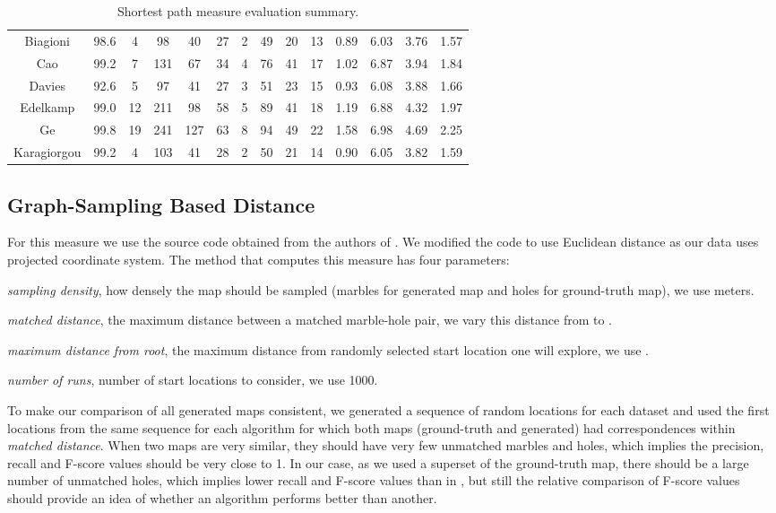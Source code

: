 \documentclass[natbib]{svjour3}                    \smartqed  \usepackage[table]{xcolor}
\begin{document}
\begin{table}[htbp]
{\begin{tabular}{|c||c|c c c c|c c c c|c c c c|}
Biagioni&98.6&4&98&40&27&2&49&20&13&0.89&6.03&3.76&1.57\\
Cao&99.2&7&131&67&34&4&76&41&17&1.02&6.87&3.94&1.84\\
\cellcolor{gray!25}Davies&\cellcolor{gray!25}92.6&\cellcolor{gray!25}5&\cellcolor{gray!25}97&\cellcolor{gray!25}41&\cellcolor{gray!25}27&3&51&23&15&0.93&6.08&3.88&1.66\\
Edelkamp&99.0&12&211&98&58&5&89&41&18&1.19&6.88&4.32&1.97\\
Ge&99.8&19&241&127&63&8&94&49&22&1.58&6.98&4.69&2.25\\
\cellcolor{gray!40}Karagiorgou&\cellcolor{gray!40}99.2&\cellcolor{gray!40}4&\cellcolor{gray!40}103&\cellcolor{gray!40}41&\cellcolor{gray!40}28&2&50&21&14&0.90&6.05&3.82&1.59\\
\hline
\end{tabular}
}
\caption{Shortest path measure evaluation summary.} 
\label{tab:sp_summary}
\end{table}

\subsection{Graph-Sampling Based Distance}

For this measure we use the source code obtained from the authors of \cite{be-irmgp-12}. We modified the code to use Euclidean distance as our data uses projected coordinate system. The method that computes this measure has four parameters: 
\begin{inparaenum}
\item{\emph{sampling density}, how densely the map should be sampled (marbles for generated map and holes for ground-truth map), we use  meters.}
\item{\emph{matched distance}, the maximum distance between a matched marble-hole pair, we vary this distance from  to .}
\item{\emph{maximum distance from root}, the maximum distance from randomly selected start location one will explore, we use .}
\item{\emph{number of runs}, number of start locations to consider, we use 1000.}
\end{inparaenum}
To make our comparison of all generated maps consistent, we generated a sequence of random locations for each dataset and used the first  locations from the same sequence for each algorithm for which both maps (ground-truth and generated) had correspondences within \emph{matched distance}. When two maps are very similar, they should have very few unmatched marbles and holes, which implies the precision, recall and F-score values should be very close to 1. In our case, as we used a superset of the ground-truth map, there should be a large number of unmatched holes, which implies lower recall and F-score values than in \cite{be-irmgp-12}, but still the relative comparison of F-score values should provide an idea of whether an algorithm performs better than another.
\end{document}
